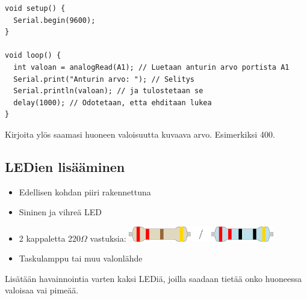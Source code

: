 \begin{lstlisting}[numbers=none,showstringspaces=false]
void setup() {
  Serial.begin(9600);
}

void loop() {
  int valoan = analogRead(A1); // Luetaan anturin arvo portista A1
  Serial.print("Anturin arvo: "); // Selitys
  Serial.println(valoan); // ja tulostetaan se
  delay(1000); // Odotetaan, etta ehditaan lukea
}
\end{lstlisting}

\begin{tcolorbox}[colback=yellow!10, title={Valoanturin arvo},colbacktitle=orange]
Kirjoita ylös saamasi huoneen valoisuutta kuvaava arvo. Esimerkiksi 400.
\end{tcolorbox}

\subsection{LEDien lisääminen}\label{sec:valo}
\begin{minipage}{0.5\textwidth}
\begin{tcolorbox}[colback=lime!10,title=Tarvikkeet, colbacktitle=green!10,coltitle=black]
\begin{itemize}
    \item Edellisen kohdan piiri rakennettuna
    \item Sininen ja vihreä LED
    \item 2 kappaletta 220$\Omega$ vastuksia:   \includegraphics[width=0.5\textwidth]{kuvat/220.pdf}
    \item Taskulamppu tai muu valonlähde
\end{itemize}
\end{tcolorbox}
\end{minipage}
\begin{minipage}{0.5\textwidth}
\begin{tcolorbox}[colback=blue!10,title=Piirin toiminta,colbacktitle=purple!90]
Lisätään havainnointia varten kaksi LEDiä, joilla saadaan tietää onko huoneessa valoisaa vai pimeää.
\tcblower
\begin{center}
\end{center}
\end{tcolorbox}
\end{minipage}

